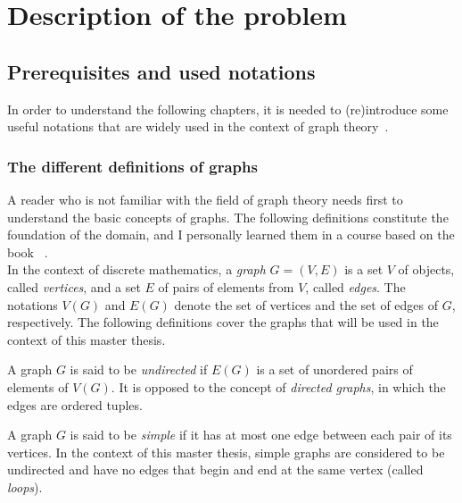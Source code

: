 \setcounter{secnumdepth}{2}

\chapter{Description of the problem}
\label{ch:description-of-the-problem}

\section{Prerequisites and used notations}
\label{sec:prerequisites-and-used-notations}

In order to understand the following chapters, it is needed to (re)introduce some useful notations that are widely used in the context of graph theory~\cite{graphtheory}.


\subsection{The different definitions of graphs}
\label{subsec:the-different-definitions-of-graphs}

A reader who is not familiar with the field of graph theory needs first to understand the basic concepts of graphs.
The following definitions constitute the foundation of the domain, and I personally learned them in a course based on the book ~\cite{graphtheory}.\\

In the context of discrete mathematics, a \textit{graph} $G = (V, E)$ is a set $V$ of objects, called \textit{vertices}, and a set $E$ of pairs of elements from $V$, called \textit{edges}.
The notations $V(G)$ and $E(G)$ denote the set of vertices and the set of edges of $G$, respectively.
The following definitions cover the graphs that will be used in the context of this master thesis.

\begin{definition}
    \label{def:undirected_graph}
    A graph $G$ is said to be \textit{undirected} if $E(G)$ is a set of unordered pairs of elements of $V(G)$.
    It is opposed to the concept of \textit{directed graphs}, in which the edges are ordered tuples.
\end{definition}

\begin{definition}
    \label{def:simple_graph}
    A graph $G$ is said to be \textit{simple} if it has at most one edge between each pair of its vertices.
    In the context of this master thesis, simple graphs are considered to be undirected and have no edges that begin and end at the same vertex (called \textit{loops}).
\end{definition}

